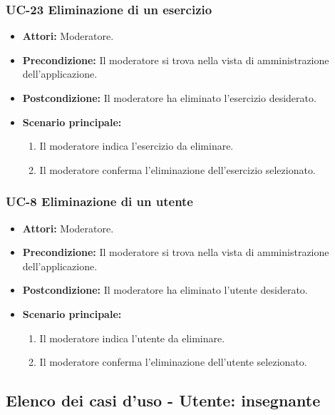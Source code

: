 \subsubsection{UC-23 Eliminazione di un esercizio}
			\begin{itemize}
			\item \textbf{Attori:} Moderatore.
			\item \textbf{Precondizione:} Il moderatore si trova nella vista di amministrazione dell'applicazione.
			\item \textbf{Postcondizione:} Il moderatore ha eliminato l'esercizio desiderato.
			\item \textbf{Scenario principale:}
				\begin{enumerate}
					\item Il moderatore indica l'esercizio da eliminare.
					\item Il moderatore conferma l'eliminazione dell'esercizio selezionato.
				\end{enumerate}
		\end{itemize}


\subsubsection{UC-8 Eliminazione di un utente}
\begin{itemize}
	\item \textbf{Attori:} Moderatore.
	\item \textbf{Precondizione:} Il moderatore si trova nella vista di amministrazione dell'applicazione.
	\item \textbf{Postcondizione:} Il moderatore ha eliminato l'utente desiderato.
	\item \textbf{Scenario principale:}
	\begin{enumerate}
		\item Il moderatore indica l'utente da eliminare.
		\item Il moderatore conferma l'eliminazione dell'utente selezionato.
	\end{enumerate}
\end{itemize}

\subsection{Elenco dei casi d'uso - Utente: insegnante}		
